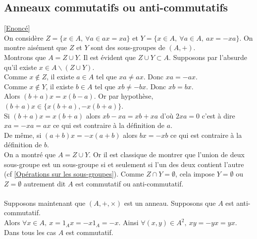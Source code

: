 \documentclass[8pt]{book}
\begin{document}
	\subsection{Anneaux commutatifs ou anti-commutatifs }
	\label{Anneaux commutatifs ou anti-commutatifs corrigé}
	\textcolor{blue}{\hyperref[Anneaux commutatifs ou anti-commutatifs]{[Enoncé]}}\\
	On considère $Z=\{x\in A,\ \forall a\in ax=xa\}$ et $Y=\{x\in A,\ \forall a\in A,\ ax=-xa\}$. On montre aisément que $Z$ et $Y$ sont des sous-groupes de $(A,+)$.\\
	Montrons que $A=Z\cup Y$. Il est évident que $Z\cup Y\subset A$. Supposons par l'absurde qu'il existe $x\in A\backslash(Z\cup Y)$.\\
	Comme $x\notin Z$, il existe $a\in A$ tel que $xa\ne ax$. Donc $xa=-ax$.\\
	Comme $x\notin Y$, il existe $b\in A$ tel que $xb\ne -bx$. Donc $xb=bx$.\\
	Alors $(b+a)x=x(b-a)$. Or par hypothèse, $(b+a)x\in \{x(b+a),-x(b+a)\}$.\\
	Si $(b+a)x=x(b+a)$ alors $xb-xa=xb+xa$ d'où $2xa=0$ c'est à dire $xa=-xa=ax$ ce qui est contraire à la définition de $a$.\\
	De même, si $(a+b)x=-x(a+b)$ alors $bx=-xb$ ce qui est contraire à la définition de $b$.\\
	On a montré que $A=Z\cup Y$. Or il est classique de montrer que l'union de deux sous-groupe est un sous-groupe si et seulement si l'un des deux contient l'autre (cf \ref{Opérations sur les sous-groupes}). Comme $Z\cap Y=\emptyset$, cela impose $Y=\emptyset$ ou $Z=\emptyset$ autrement dit $A$ est commutatif ou anti-commutatif.\\\\
	Supposons maintenant que $(A,+,\times)$ est un anneau. Supposons que $A$ est anti-commutatif.\\
	Alors $\forall x\in A,\ x=1_Ax=-x1_A=-x$. Ainsi $\forall (x,y)\in A^2,\ xy=-yx=yx$.\\
	Dans tous les cas $A$ est commutatif.
	
\end{document}
